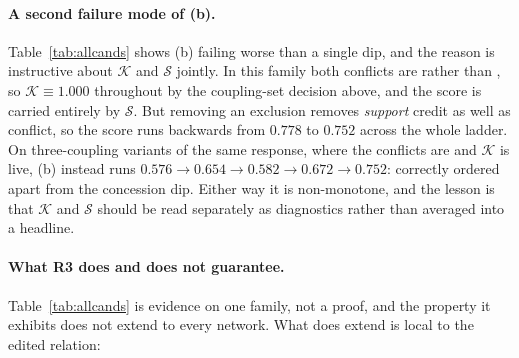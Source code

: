 \paragraph{A second failure mode of (b).} Table~\ref{tab:allcands} shows (b) failing worse than a
single dip, and the reason is instructive about $\mathcal{K}$ and $\mathcal{S}$ jointly. In this
family both conflicts are \exc{} rather than \con{}, so $\mathcal{K}\equiv1.000$ throughout by the
coupling-set decision above, and the score is carried entirely by $\mathcal{S}$. But removing an
exclusion removes \emph{support} credit as well as conflict, so the score runs backwards from
$0.778$ to $0.752$ across the whole ladder. On three-coupling variants of the same response, where
the conflicts are \con{} and $\mathcal{K}$ is live, (b) instead runs
$0.576 \to 0.654 \to \mathbf{0.582} \to 0.672 \to 0.752$: correctly ordered apart from the concession
dip. Either way it is non-monotone, and the lesson is that $\mathcal{K}$ and $\mathcal{S}$ should be
read separately as diagnostics rather than averaged into a headline.

\paragraph{What R3 does and does not guarantee.} Table~\ref{tab:allcands} is evidence on one
family, not a proof, and the property it exhibits does not extend to every network. What does
extend is local to the edited relation:

